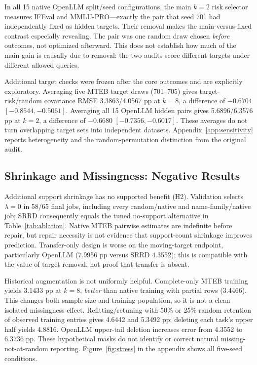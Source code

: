 \documentclass{article}
\begin{document}
In all 15 native OpenLLM split/seed configurations, the main $k=2$ risk selector measures IFEval and MMLU-PRO---exactly the pair that seed 701 had independently fixed as hidden targets. Their removal makes the main-versus-fixed contrast especially revealing. The pair was one random draw chosen \emph{before} outcomes, not optimized afterward. This does not establish how much of the main gain is causally due to removal: the two audits score different targets under different allowed queries.

Additional target checks were frozen after the core outcomes and are explicitly exploratory. Averaging five MTEB target draws (701--705) gives target-risk/random covariance RMSE 3.3863/4.0567 pp at $k=8$, a difference of $-0.6704$ $[-0.8544,-0.5061]$. Averaging all 15 OpenLLM hidden pairs gives 5.6896/6.3576 pp at $k=2$, a difference of $-0.6680$ $[-0.7356,-0.6017]$. These averages do not turn overlapping target sets into independent datasets. Appendix~\ref{app:sensitivity} reports heterogeneity and the random-permutation distinction from the original audit.

\subsection{Shrinkage and Missingness: Negative Results}
\begin{table}[t]
\caption{Random/native ablations: mean RMSE $\pm$ split SD (pp), \emph{not} confidence intervals. No-support covariance is tuned over the same diagonal-shrinkage grid with $\lambda=0$. Minimal PSD repair fixes $\lambda=\alpha=0$ but retains the positive eigenvalue floor. Variance and transfer-only rules retain the corresponding terms of Equation~\eqref{eq:gain}.}
\label{tab:ablation}
\centering

\end{table}

Additional support shrinkage has no supported benefit (H2). Validation selects $\lambda=0$ in 58/65 final jobs, including every random/native and name-family/native job; SRRD consequently equals the tuned no-support alternative in Table~\ref{tab:ablation}. Native MTEB pairwise estimates are indefinite before repair, but repair necessity is not evidence that support-count shrinkage improves prediction. Transfer-only design is worse on the moving-target endpoint, particularly OpenLLM (7.9956 pp versus SRRD 4.3552); this is compatible with the value of target removal, not proof that transfer is absent.

Historical augmentation is not uniformly helpful. Complete-only MTEB training yields 3.1433 pp at $k=8$, \emph{better} than native training with partial rows (3.4466). This changes both sample size and training population, so it is not a clean isolated missingness effect. Refitting/retuning with 50\% or 25\% random retention of observed training entries gives 4.6442 and 5.3492 pp; deleting each task's upper half yields 4.8816. OpenLLM upper-tail deletion increases error from 4.3552 to 6.3736 pp. These hypothetical masks do not identify or correct natural missing-not-at-random reporting. Figure~\ref{fig:stress} in the appendix shows all five-seed conditions.
\end{document}
